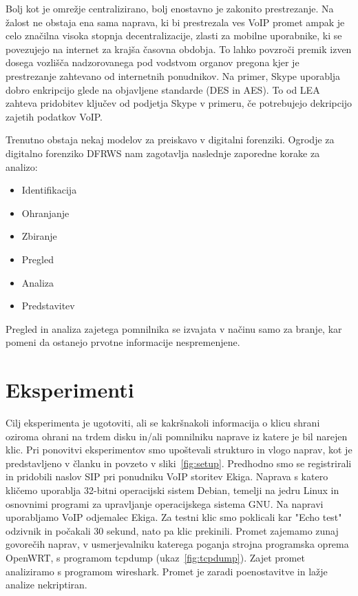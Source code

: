 \documentclass{acm_proc_article-sp}
\begin{document}
Bolj kot je omrežje centralizirano, bolj enostavno je zakonito prestrezanje. Na žalost ne obstaja ena sama naprava, ki bi prestrezala ves VoIP promet ampak je celo značilna visoka stopnja decentralizacije, zlasti za mobilne uporabnike, ki se povezujejo na internet za krajša časovna obdobja. To lahko povzroči premik izven dosega vozlišča nadzorovanega pod vodstvom organov pregona kjer je prestrezanje zahtevano od internetnih ponudnikov. Na primer, Skype uporablja dobro enkripcijo glede na objavljene standarde (DES in AES). To od LEA zahteva pridobitev ključev od podjetja Skype v primeru, če potrebujejo dekripcijo zajetih podatkov VoIP.

Trenutno obstaja nekaj modelov za preiskavo v digitalni forenziki. Ogrodje za digitalno forenziko DFRWS nam zagotavlja naslednje zaporedne korake za analizo:
\begin{itemize}
  \item Identifikacija
  \item Ohranjanje
  \item Zbiranje
  \item Pregled
  \item Analiza
  \item Predstavitev
\end{itemize}

Pregled in analiza zajetega pomnilnika se izvajata v načinu samo za branje, kar pomeni da ostanejo prvotne informacije nespremenjene.


\section{Eksperimenti}

Cilj eksperimenta je ugotoviti, ali se kakršnakoli informacija o klicu shrani oziroma ohrani na trdem disku in/ali pomnilniku naprave iz katere je bil narejen klic\cite{RECONSTRUCTION}. Pri ponovitvi eksperimentov smo upoštevali strukturo in vlogo naprav, kot je predstavljeno v članku in povzeto v sliki~\ref{fig:setup}. Predhodno smo se registrirali in pridobili naslov SIP pri ponudniku VoIP storitev Ekiga. Naprava s katero kličemo uporablja 32-bitni operacijski sistem Debian, temelji na jedru Linux in osnovnimi programi za upravljanje operacijskega sistema GNU. Na napravi uporabljamo VoIP odjemalec Ekiga. Za testni klic smo poklicali kar "Echo test" odzivnik in počakali 30 sekund, nato pa klic prekinili. Promet zajemamo zunaj govorečih naprav, v usmerjevalniku katerega poganja strojna programska oprema OpenWRT, s programom tcpdump (ukaz~\ref{fig:tcpdump}). Zajet promet analiziramo s programom wireshark. Promet je zaradi poenostavitve in lažje analize nekriptiran.
\end{document}
